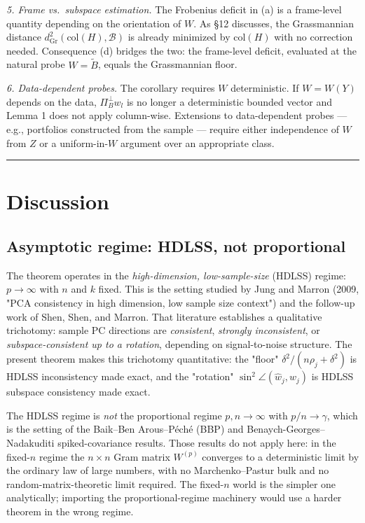 \documentclass{article}
\theoremstyle{remark}
\begin{document}
\textit{5. Frame vs.\ subspace estimation.} The Frobenius deficit in (a) is a frame-level quantity depending on the orientation of $W$. As §12 discusses, the Grassmannian distance $d_{\mathrm{Gr}}^2(\mathrm{col}(H),\mathcal{B})$ is already minimized by $\mathrm{col}(H)$ with no correction needed. Consequence (d) bridges the two: the frame-level deficit, evaluated at the natural probe $W = \tilde{B}$, equals the Grassmannian floor.

\textit{6. Data-dependent probes.} The corollary requires $W$ deterministic. If $W = W(Y)$ depends on the data, $\Pi_B^\perp w_l$ is no longer a deterministic bounded vector and Lemma 1 does not apply column-wise. Extensions to data-dependent probes — e.g., portfolios constructed from the sample — require either independence of $W$ from $Z$ or a uniform-in-$W$ argument over an appropriate class.

\medskip\noindent\rule{\linewidth}{0.4pt}\medskip

\section{Discussion}

\subsection{Asymptotic regime: HDLSS, not proportional}

The theorem operates in the \textit{high-dimension, low-sample-size} (HDLSS) regime: $p \to \infty$ with $n$ and $k$ fixed. This is the setting studied by Jung and Marron (2009, "PCA consistency in high dimension, low sample size context") and the follow-up work of Shen, Shen, and Marron. That literature establishes a qualitative trichotomy: sample PC directions are \textit{consistent}, \textit{strongly inconsistent}, or \textit{subspace-consistent up to a rotation}, depending on signal-to-noise structure. The present theorem makes this trichotomy quantitative: the "floor" $\delta^2/(n\rho_j+\delta^2)$ is HDLSS inconsistency made exact, and the "rotation" $\sin^2\angle(\hat{w}_j, w_j)$ is HDLSS subspace consistency made exact.

The HDLSS regime is \textit{not} the proportional regime $p, n \to \infty$ with $p/n \to \gamma$, which is the setting of the Baik–Ben Arous–Péché (BBP) and Benaych-Georges–Nadakuditi spiked-covariance results. Those results do not apply here: in the fixed-$n$ regime the $n \times n$ Gram matrix $W^{(p)}$ converges to a deterministic limit by the ordinary law of large numbers, with no Marchenko–Pastur bulk and no random-matrix-theoretic limit required. The fixed-$n$ world is the simpler one analytically; importing the proportional-regime machinery would use a harder theorem in the wrong regime.
\end{document}
